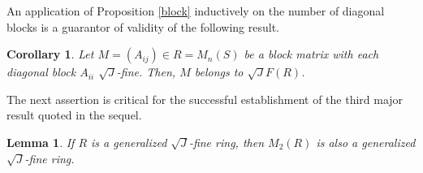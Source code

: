 \documentclass[12pt]{amsart}
\newtheorem{lemma}[theorem]{Lemma}
\newtheorem{corollary}[theorem]{Corollary}
\theoremstyle{definition}
\begin{document}
An application of Proposition \ref{block} inductively on the number of diagonal blocks is a guarantor of validity of the following result.

\begin{corollary}\label{Block}
Let \( M = (A_{ij}) \in R = M_n(S) \) be a block matrix with each diagonal block \( A_{ii} \) \(\sqrt{J}\)-fine. Then, \( M \) belongs to \(\sqrt{J}F(R)\).
\end{corollary}

The next assertion is critical for the successful establishment of the third major result quoted in the sequel.

\begin{lemma}\label{2.4}
If \( R \) is a generalized $\sqrt{J}$-fine ring, then \( M_2(R) \) is also a generalized $\sqrt{J}$-fine ring.
\end{lemma}
\end{document}
